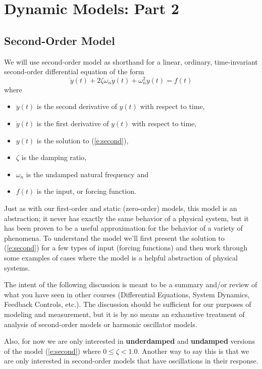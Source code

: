 \chapter{Dynamic Models: Part 2}\label{c:model2}

\section{Second-Order Model}
We will use \gls{second-order model} as shorthand for a linear, ordinary, time-invariant second-order differential equation of the form
\begin{equation} \label{e:second}
\ddot{y}(t) + 2 \zeta \omega_n \dot{y}(t) + \omega_n^2 y(t) = f(t)
\end{equation} 
where 
\begin{itemize}
\item $\ddot{y}(t)$ is the second derivative of $y(t)$ with respect to time,
\item $\dot{y}(t)$ is the first derivative of $y(t)$ with respect to time,
\item $y(t)$ is the solution to (\ref{e:second}),
\item $\zeta$ is the \gls{damping ratio},
\item $\omega_n$ is the \gls{undamped natural frequency} and
\item $f(t)$ is the input, or forcing function.
\end{itemize}
Just as with our first-order and static (zero-order) models, this model is an abstraction; it never has exactly the same behavior of a physical system, but it has been proven to be a useful approximation for the behavior of a variety of phenomena.  To understand the model we'll first present the solution to (\ref{e:second}) for a few types of input (forcing functions) and then work through some examples of cases where the model is a helpful abstraction of physical systems.

The intent of the following discussion is meant to be a summary and/or review of what you have seen in other courses (Differential Equations, System Dynamics, Feedback Controls, etc.).  The discussion should be sufficient for our purposes of modeling and measurement, but it is by no means an exhaustive treatment of analysis of second-order models or harmonic oscillator models.

Also, for now we are only interested in {\bf underdamped} and {\bf undamped} versions of the model (\ref{e:second}) where $0 \leq \zeta < 1.0$.  Another way to say this is that we are only interested in second-order models that have oscillations in their response.

